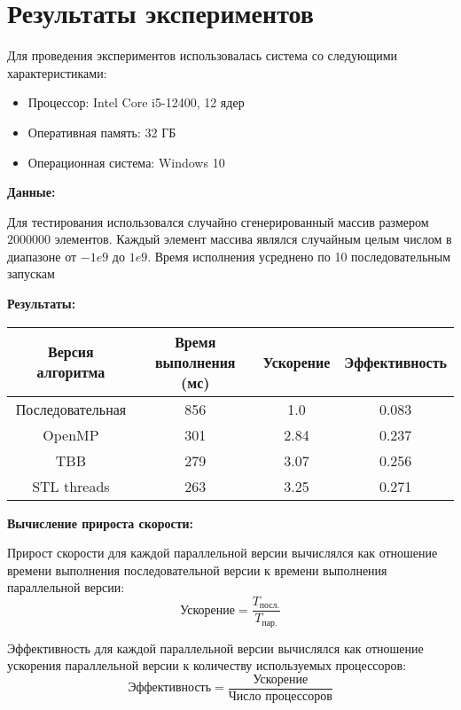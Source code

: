 \documentclass{report}
\begin{document}
\newpage

\section*{Результаты экспериментов}
\par Для проведения экспериментов использовалась система со следующими характеристиками:
\begin{itemize}
    \item Процессор: Intel Core i5-12400, 12 ядер
    \item Оперативная память: 32 ГБ
    \item Операционная система: Windows 10
\end{itemize}

\par \textbf{Данные:}
\par Для тестирования использовался случайно сгенерированный массив размером \(2000000\) элементов. Каждый элемент массива являлся случайным целым числом в диапазоне от \(-1e9\) до \(1e9\). Время исполнения усреднено по 10 последовательным запускам
\par 

\par \textbf{Результаты:}
\begin{center}
\begin{tabular}{ |c|c|c|c| }
    \hline
    Версия алгоритма & Время выполнения (мс) & Ускорение & Эффективность \\ 
    \hline
    Последовательная & 856 & 1.0 & 0.083 \\ 
    \hline
    OpenMP & 301 & 2.84 & 0.237 \\ 
    \hline
    TBB & 279 & 3.07 & 0.256 \\ 
    \hline
    STL threads & 263 & 3.25 & 0.271 \\ 
    \hline
\end{tabular}
\end{center}

\par \textbf{Вычисление прироста скорости:}
\par Прирост скорости для каждой параллельной версии вычислялся как отношение времени выполнения последовательной версии к времени выполнения параллельной версии:
\[ \text{Ускорение} = \frac{T_{\text{посл.}}}{T_{\text{пар.}}} \]
\par Эффективность для каждой параллельной версии вычислялся как отношение ускорения параллельной версии к количеству используемых процессоров:
\[ \text{Эффективность} = \frac{{\text{Ускорение}}}{{\text{Число процессоров}}} \]
\end{document}
